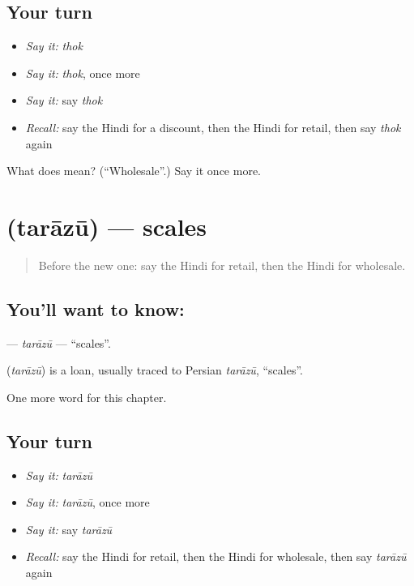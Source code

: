 \subsection*{Your turn}
\begin{itemize}
\raggedright
  \item \emph{Say it:} \emph{thok}
  \item \emph{Say it:} \emph{thok}, once more
  \item \emph{Say it:} say \emph{thok}
  \item \emph{Recall:} say the Hindi for a discount, then the Hindi for retail, then say \emph{thok} again
\end{itemize}

\begin{tcolorbox}[breakable,colback=teal!4,colframe=teal!35!black,title={Before you move on}]
What does  mean? (\textquotedblleft{}Wholesale\textquotedblright{}.) Say it once more.
\end{tcolorbox}
\section[\texorpdfstring{\hi{तराज़ू} (tarāzū)}{तराज़ू (tarāzū)}]{ (tarāzū) — scales}

\label{lesson:HI-C251-tarazu}



\begin{quote}
Before the new one: say the Hindi for retail, then the Hindi for wholesale.
\end{quote}

\subsection*{You'll want to know: }
\textbf{} — \emph{tarāzū} — \textquotedblleft{}scales\textquotedblright{}.

\begin{cousinweb}
\textbf{} (\emph{tarāzū}) is a loan, usually traced to Persian \emph{tarāzū}, \textquotedblleft{}scales\textquotedblright{}.
\end{cousinweb}

\begin{grammarlens}[title={What you've built}]
One more word for this chapter.
\end{grammarlens}

\subsection*{Your turn}
\begin{itemize}
\raggedright
  \item \emph{Say it:} \emph{tarāzū}
  \item \emph{Say it:} \emph{tarāzū}, once more
  \item \emph{Say it:} say \emph{tarāzū}
  \item \emph{Recall:} say the Hindi for retail, then the Hindi for wholesale, then say \emph{tarāzū} again
\end{itemize}

